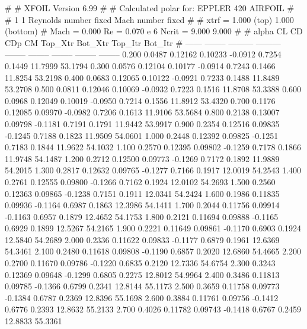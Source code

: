 #  
#       XFOIL         Version 6.99
#  
# Calculated polar for: EPPLER 420 AIRFOIL                              
#  
# 1 1 Reynolds number fixed          Mach number fixed         
#  
# xtrf =   1.000 (top)        1.000 (bottom)  
# Mach =   0.000     Re =     0.070 e 6     Ncrit =   9.000  9.000
#  
#   alpha    CL        CD       CDp       CM     Top_Xtr  Bot_Xtr  Top_Itr  Bot_Itr
#  ------ -------- --------- --------- -------- -------- -------- -------- --------
   0.200   0.0487   0.12162   0.10233  -0.0912   0.7254   0.1449  11.7999  53.1794
   0.300   0.0576   0.12104   0.10177  -0.0914   0.7243   0.1466  11.8254  53.2198
   0.400   0.0683   0.12065   0.10122  -0.0921   0.7233   0.1488  11.8489  53.2708
   0.500   0.0811   0.12046   0.10069  -0.0932   0.7223   0.1516  11.8708  53.3388
   0.600   0.0968   0.12049   0.10019  -0.0950   0.7214   0.1556  11.8912  53.4320
   0.700   0.1176   0.12085   0.09970  -0.0982   0.7206   0.1613  11.9106  53.5684
   0.800   0.2138   0.13007   0.09798  -0.1181   0.7191   0.1791  11.9442  53.9917
   0.900   0.2354   0.12516   0.09835  -0.1245   0.7188   0.1823  11.9509  54.0601
   1.000   0.2448   0.12392   0.09825  -0.1251   0.7183   0.1844  11.9622  54.1032
   1.100   0.2570   0.12395   0.09802  -0.1259   0.7178   0.1866  11.9748  54.1487
   1.200   0.2712   0.12500   0.09773  -0.1269   0.7172   0.1892  11.9889  54.2015
   1.300   0.2817   0.12632   0.09765  -0.1277   0.7166   0.1917  12.0019  54.2543
   1.400   0.2761   0.12555   0.09800  -0.1266   0.7162   0.1924  12.0102  54.2693
   1.500   0.2560   0.12363   0.09865  -0.1238   0.7151   0.1911  12.0341  54.2424
   1.600   0.1986   0.11835   0.09936  -0.1164   0.6987   0.1863  12.3986  54.1411
   1.700   0.2044   0.11756   0.09914  -0.1163   0.6957   0.1879  12.4652  54.1753
   1.800   0.2121   0.11694   0.09888  -0.1165   0.6929   0.1899  12.5267  54.2165
   1.900   0.2221   0.11649   0.09861  -0.1170   0.6903   0.1924  12.5840  54.2689
   2.000   0.2336   0.11622   0.09833  -0.1177   0.6879   0.1961  12.6369  54.3461
   2.100   0.2480   0.11618   0.09808  -0.1190   0.6857   0.2020  12.6860  54.4665
   2.200   0.2700   0.11670   0.09786  -0.1220   0.6835   0.2120  12.7336  54.6754
   2.300   0.3243   0.12369   0.09648  -0.1299   0.6805   0.2275  12.8012  54.9964
   2.400   0.3486   0.11813   0.09785  -0.1366   0.6799   0.2341  12.8144  55.1173
   2.500   0.3659   0.11758   0.09773  -0.1384   0.6787   0.2369  12.8396  55.1698
   2.600   0.3884   0.11761   0.09756  -0.1412   0.6776   0.2393  12.8632  55.2133
   2.700   0.4026   0.11782   0.09743  -0.1418   0.6767   0.2459  12.8833  55.3361
